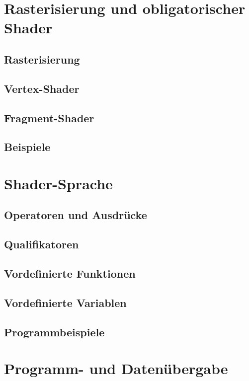 \section{Rasterisierung und obligatorischer Shader}
\subsection{Rasterisierung}
\subsection{Vertex-Shader}
\subsection{Fragment-Shader}

\subsection{Beispiele}

\section{Shader-Sprache}
\subsection{Operatoren und Ausdrücke}
\subsection{Qualifikatoren}

\subsection{Vordefinierte Funktionen}

\subsection{Vordefinierte Variablen}

\subsection{Programmbeispiele}

\section{Programm- und Datenübergabe}
